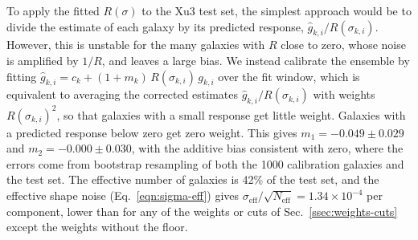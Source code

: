 To apply the fitted $R(\sigma)$ to the Xu3 test set, the simplest approach would be to divide the estimate of each galaxy by its predicted response, $\hat{g}_{k,i}/R(\sigma_{k,i})$. However, this is unstable for the many galaxies with $R$ close to zero, whose noise is amplified by $1/R$, and leaves a large bias. We instead calibrate the ensemble by fitting $\hat{g}_{k,i} = c_k + (1+m_k)\,R(\sigma_{k,i})\,g_{k,i}$ over the fit window, which is equivalent to averaging the corrected estimates $\hat{g}_{k,i}/R(\sigma_{k,i})$ with weights $R(\sigma_{k,i})^2$, so that galaxies with a small response get little weight. Galaxies with a predicted response below zero get zero weight. This gives $m_1 = -0.049 \pm 0.029$ and $m_2 = -0.000 \pm 0.030$, with the additive bias consistent with zero, where the errors come from bootstrap resampling of both the 1000 calibration galaxies and the test set. The effective number of galaxies is 42\% of the test set, and the effective shape noise (Eq.~\ref{eqn:sigma-eff}) gives $\sigma_\mathrm{eff}/\sqrt{N_\mathrm{eff}} = 1.34\times10^{-4}$ per component, lower than for any of the weights or cuts of Sec.~\ref{ssec:weights-cuts} except the weights without the floor.
